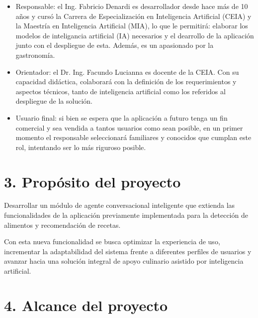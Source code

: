 \documentclass[
11pt, %
]{charter}
\begin{document}
\begin{itemize}
	\item Responsable: el Ing. Fabricio Denardi es desarrollador desde hace más de 10 años y cursó la Carrera de Especialización en Inteligencia Artificial (CEIA) y la Maestría en Inteligencia Artificial (MIA), lo que le permitirá: elaborar los modelos de inteligancia artificial (IA) necesarios y el dearrollo de la aplicación junto con el despliegue de esta. Además, es un apasionado por la gastronomía.
	\item Orientador: el Dr. Ing. Facundo Lucianna es docente de la CEIA. Con su capacidad didáctica, colaborará con la definición de los requerimientos y aspectos técnicos, tanto de inteligencia artificial como los referidos al despliegue de la solución.
	\item Usuario final: si bien se espera que la aplicación a futuro tenga un fin comercial y sea vendida a tantos usuarios como sean posible, en un primer momento el responsable seleccionará familiares y conocidos que cumplan este rol, intentando ser lo más riguroso posible.
\end{itemize}


\section{3. Propósito del proyecto}
\label{sec:proposito}

Desarrollar un módulo de agente conversacional inteligente que extienda las funcionalidades de la aplicación previamente implementada para la detección de alimentos y recomendación de recetas. 

Con esta nueva funcionalidad se busca optimizar la experiencia de uso, incrementar la adaptabilidad del sistema frente a diferentes perfiles de usuarios y avanzar hacia una solución integral de apoyo culinario asistido por inteligencia artificial.

\section{4. Alcance del proyecto}
\label{sec:alcance}
\end{document}
